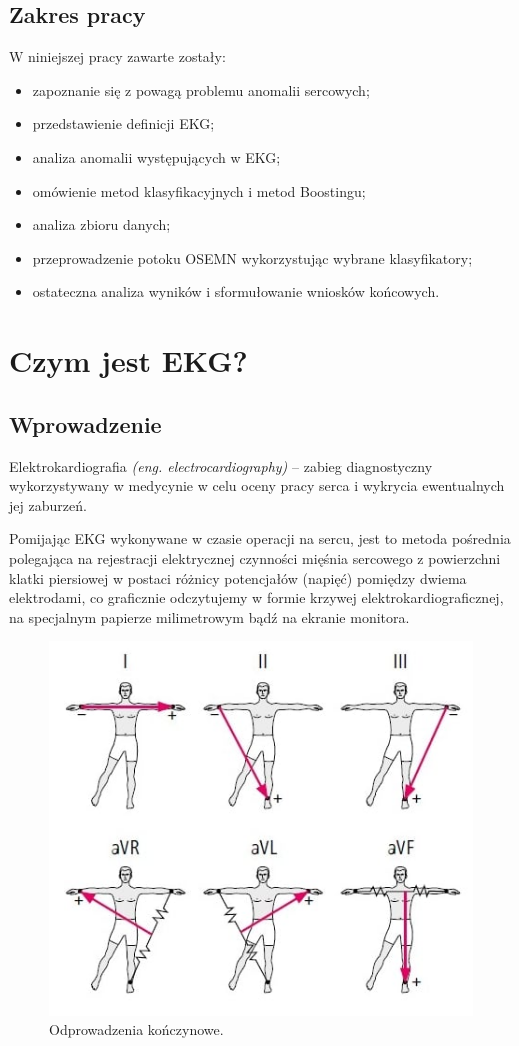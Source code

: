 \documentclass[12pt,a4paper]{article}
\begin{document}
\subsection{Zakres pracy}
W niniejszej pracy zawarte zostały:
\begin{itemize}
    \item zapoznanie się z powagą problemu anomalii sercowych;
    \item przedstawienie definicji EKG;
    \item analiza anomalii występujących w EKG;
    \item omówienie metod klasyfikacyjnych i metod Boostingu;
    \item analiza zbioru danych;
    \item przeprowadzenie potoku OSEMN wykorzystując wybrane klasyfikatory; 
    \item ostateczna analiza wyników i sformułowanie wniosków końcowych. 
\end{itemize}




\section{Czym jest EKG?}

\subsection{Wprowadzenie}
Elektrokardiografia \textit{(eng. electrocardiography)} \cite{elektrokardiografia-wikipedia}  – zabieg diagnostyczny wykorzystywany w medycynie w celu oceny pracy serca i wykrycia ewentualnych jej zaburzeń.

Pomijając EKG wykonywane w czasie operacji na sercu, jest to metoda pośrednia polegająca na rejestracji elektrycznej czynności mięśnia sercowego z powierzchni klatki piersiowej w postaci różnicy potencjałów (napięć) pomiędzy dwiema elektrodami, co graficznie odczytujemy w formie krzywej elektrokardiograficznej, na specjalnym papierze milimetrowym bądź na ekranie monitora.

\begin{figure}[h]
    \centering
    \includegraphics[width=0.75\linewidth]{images/ekg_odprowadzenia.jpg}
    \caption{Odprowadzenia kończynowe. \cite{ekg-odprowadzenia-konczynowe}}
\end{figure}
\end{document}
